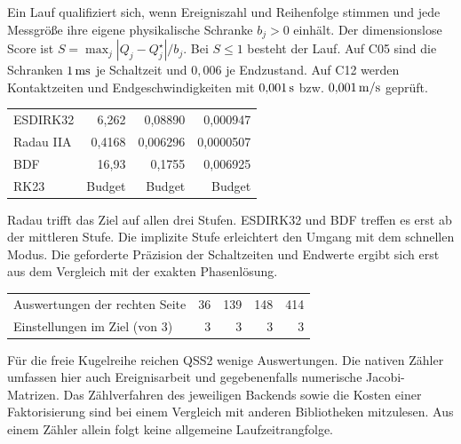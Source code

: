 Ein Lauf qualifiziert sich, wenn Ereigniszahl und Reihenfolge stimmen und jede Messgröße ihre eigene physikalische Schranke \(b_j>0\) einhält. Der dimensionslose Score ist \(S=\max_j|Q_j-Q_j^\star|/b_j\). Bei \(S\le1\) besteht der Lauf. Auf C05 sind die Schranken \(1\,\mathrm{ms}\) je Schaltzeit und \(0{,}006\) je Endzustand. Auf C12 werden Kontaktzeiten und Endgeschwindigkeiten mit \(0{,}001\,\mathrm{s}\) bzw. \(0{,}001\,\mathrm{m/s}\) geprüft.
{\tblstart\begin{tabularx}{\linewidth}{@{}Yrrr@{}}\toprule
{}&&&\\\midrule
ESDIRK32&6,262&0,08890&0,000947\\
Radau IIA&0,4168&0,006296&0,0000507\\
BDF&16,93&0,1755&0,006925\\
RK23&Budget&Budget&Budget\\\bottomrule
\end{tabularx}\par}

Radau trifft das Ziel auf allen drei Stufen. ESDIRK32 und BDF treffen es erst ab der mittleren Stufe. Die implizite Stufe erleichtert den Umgang mit dem schnellen Modus. Die geforderte Präzision der Schaltzeiten und Endwerte ergibt sich erst aus dem Vergleich mit der exakten Phasenlösung.
{\tblstart\begin{tabularx}{\linewidth}{@{}Yrrrr@{}}\toprule
{}&&&&\\\midrule
Auswertungen der rechten Seite&36&139&148&414\\
Einstellungen im Ziel (von 3)&3&3&3&3\\\bottomrule
\end{tabularx}\par}
Für die freie Kugelreihe reichen QSS2 wenige Auswertungen. Die nativen Zähler umfassen hier auch Ereignisarbeit und gegebenenfalls numerische Jacobi-Matrizen. Das Zählverfahren des jeweiligen Backends sowie die Kosten einer Faktorisierung sind bei einem Vergleich mit anderen Bibliotheken mitzulesen. Aus einem Zähler allein folgt keine allgemeine Laufzeitrangfolge.

